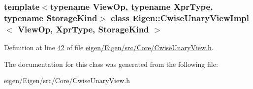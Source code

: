 \subsubsection*{template$<$typename View\+Op, typename Xpr\+Type, typename Storage\+Kind$>$\newline
class Eigen\+::\+Cwise\+Unary\+View\+Impl$<$ View\+Op, Xpr\+Type, Storage\+Kind $>$}



Definition at line \hyperlink{eigen_2_eigen_2src_2_core_2_cwise_unary_view_8h_source_l00042}{42} of file \hyperlink{eigen_2_eigen_2src_2_core_2_cwise_unary_view_8h_source}{eigen/\+Eigen/src/\+Core/\+Cwise\+Unary\+View.\+h}.



The documentation for this class was generated from the following file\+:\begin{DoxyCompactItemize}
\item 
eigen/\+Eigen/src/\+Core/\+Cwise\+Unary\+View.\+h\end{DoxyCompactItemize}

